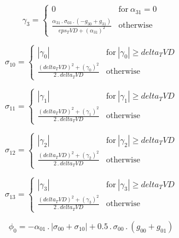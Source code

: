 \documentclass{article}
\begin{document}
\begin{dmath}\gamma_{3} = \begin{cases} 0 & \text{for}\: \alpha_{31} = 0 \\\frac{\alpha_{31} \,.\, \sigma_{0 3} \,.\, \left(- g_{30} + g_{31}\right)}{eps_TVD + \left(\alpha_{31} \right)^{2}} & \text{otherwise} \end{cases}\end{dmath}

\begin{dmath}\sigma_{1 0} = \begin{cases} \left|{\gamma_{0}}\right| & \text{for}\: \left|{\gamma_{0}}\right| \geq delta_TVD \\\frac{\left(delta_TVD \right)^{2} + \left(\gamma_{0} \right)^{2}}{2 \,.\, delta_TVD} & \text{otherwise} 
\end{cases}\end{dmath}

\begin{dmath}\sigma_{1 1} = \begin{cases} \left|{\gamma_{1}}\right| & \text{for}\: \left|{\gamma_{1}}\right| \geq delta_TVD \\\frac{\left(delta_TVD \right)^{2} + \left(\gamma_{1} \right)^{2}}{2 \,.\, delta_TVD} & \text{otherwise} 
\end{cases}\end{dmath}

\begin{dmath}\sigma_{1 2} = \begin{cases} \left|{\gamma_{2}}\right| & \text{for}\: \left|{\gamma_{2}}\right| \geq delta_TVD \\\frac{\left(delta_TVD \right)^{2} + \left(\gamma_{2} \right)^{2}}{2 \,.\, delta_TVD} & \text{otherwise} 
\end{cases}\end{dmath}

\begin{dmath}\sigma_{1 3} = \begin{cases} \left|{\gamma_{3}}\right| & \text{for}\: \left|{\gamma_{3}}\right| \geq delta_TVD \\\frac{\left(delta_TVD \right)^{2} + \left(\gamma_{3} \right)^{2}}{2 \,.\, delta_TVD} & \text{otherwise} 
\end{cases}\end{dmath}

\begin{dmath}\phi_{0} = - \alpha_{01} \,.\, \left|{\sigma_{0 0} + \sigma_{1 0}}\right| + 0.5 \,.\, \sigma_{0 0} \,.\, \left(g_{00} + g_{01}\right)\end{dmath}
\end{document}
